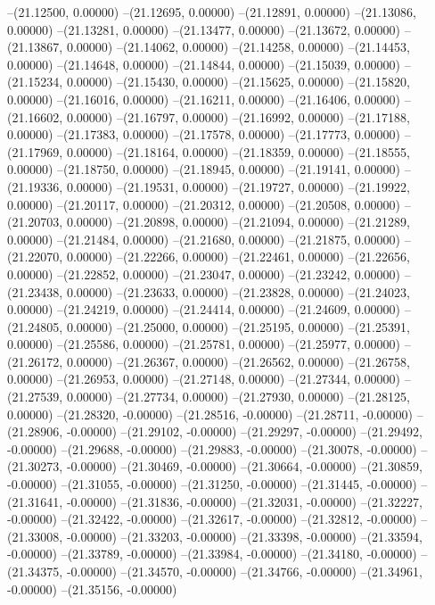 --(21.12500, 0.00000)
--(21.12695, 0.00000)
--(21.12891, 0.00000)
--(21.13086, 0.00000)
--(21.13281, 0.00000)
--(21.13477, 0.00000)
--(21.13672, 0.00000)
--(21.13867, 0.00000)
--(21.14062, 0.00000)
--(21.14258, 0.00000)
--(21.14453, 0.00000)
--(21.14648, 0.00000)
--(21.14844, 0.00000)
--(21.15039, 0.00000)
--(21.15234, 0.00000)
--(21.15430, 0.00000)
--(21.15625, 0.00000)
--(21.15820, 0.00000)
--(21.16016, 0.00000)
--(21.16211, 0.00000)
--(21.16406, 0.00000)
--(21.16602, 0.00000)
--(21.16797, 0.00000)
--(21.16992, 0.00000)
--(21.17188, 0.00000)
--(21.17383, 0.00000)
--(21.17578, 0.00000)
--(21.17773, 0.00000)
--(21.17969, 0.00000)
--(21.18164, 0.00000)
--(21.18359, 0.00000)
--(21.18555, 0.00000)
--(21.18750, 0.00000)
--(21.18945, 0.00000)
--(21.19141, 0.00000)
--(21.19336, 0.00000)
--(21.19531, 0.00000)
--(21.19727, 0.00000)
--(21.19922, 0.00000)
--(21.20117, 0.00000)
--(21.20312, 0.00000)
--(21.20508, 0.00000)
--(21.20703, 0.00000)
--(21.20898, 0.00000)
--(21.21094, 0.00000)
--(21.21289, 0.00000)
--(21.21484, 0.00000)
--(21.21680, 0.00000)
--(21.21875, 0.00000)
--(21.22070, 0.00000)
--(21.22266, 0.00000)
--(21.22461, 0.00000)
--(21.22656, 0.00000)
--(21.22852, 0.00000)
--(21.23047, 0.00000)
--(21.23242, 0.00000)
--(21.23438, 0.00000)
--(21.23633, 0.00000)
--(21.23828, 0.00000)
--(21.24023, 0.00000)
--(21.24219, 0.00000)
--(21.24414, 0.00000)
--(21.24609, 0.00000)
--(21.24805, 0.00000)
--(21.25000, 0.00000)
--(21.25195, 0.00000)
--(21.25391, 0.00000)
--(21.25586, 0.00000)
--(21.25781, 0.00000)
--(21.25977, 0.00000)
--(21.26172, 0.00000)
--(21.26367, 0.00000)
--(21.26562, 0.00000)
--(21.26758, 0.00000)
--(21.26953, 0.00000)
--(21.27148, 0.00000)
--(21.27344, 0.00000)
--(21.27539, 0.00000)
--(21.27734, 0.00000)
--(21.27930, 0.00000)
--(21.28125, 0.00000)
--(21.28320, -0.00000)
--(21.28516, -0.00000)
--(21.28711, -0.00000)
--(21.28906, -0.00000)
--(21.29102, -0.00000)
--(21.29297, -0.00000)
--(21.29492, -0.00000)
--(21.29688, -0.00000)
--(21.29883, -0.00000)
--(21.30078, -0.00000)
--(21.30273, -0.00000)
--(21.30469, -0.00000)
--(21.30664, -0.00000)
--(21.30859, -0.00000)
--(21.31055, -0.00000)
--(21.31250, -0.00000)
--(21.31445, -0.00000)
--(21.31641, -0.00000)
--(21.31836, -0.00000)
--(21.32031, -0.00000)
--(21.32227, -0.00000)
--(21.32422, -0.00000)
--(21.32617, -0.00000)
--(21.32812, -0.00000)
--(21.33008, -0.00000)
--(21.33203, -0.00000)
--(21.33398, -0.00000)
--(21.33594, -0.00000)
--(21.33789, -0.00000)
--(21.33984, -0.00000)
--(21.34180, -0.00000)
--(21.34375, -0.00000)
--(21.34570, -0.00000)
--(21.34766, -0.00000)
--(21.34961, -0.00000)
--(21.35156, -0.00000)
